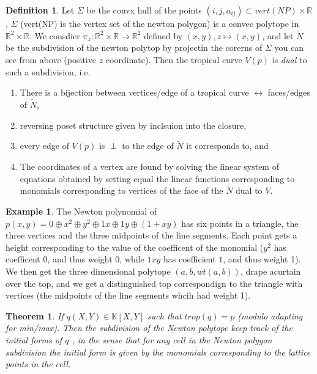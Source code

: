 \documentclass[11pt]{article}
\newtheorem{prototheorem}{Theorem}[section]
\newenvironment{theorem}
   {\begin{prototheorem}}
   {\end{prototheorem}}
\theoremstyle{definition}
\newtheorem{protoexample}{Example}[section]
\newenvironment{ex}
   {\begin{protoexample}}
   {\end{protoexample}}
\newtheorem{protodefinition}{Definition}[section]
\newenvironment{define}
   {\begin{protodefinition}}
   {\end{protodefinition}}
\def\RR{{\mathbb R}}
\def\KK{{\mathbb K}}
\begin{document}
\begin{define}
Let $\Sigma$ be the convx hull of the points $(i,j,a_{ij})\subset vert(NP)\times \RR$, $\Sigma$ (vert(NP) is the vertex set of the newton polygon) is a convec polytope in $\RR^2 \times \RR$. We consdier $\pi_z: \RR^2 \times \RR \rightarrow \RR^2$ defined by $(x,y), z \mapsto (x,y)$, and let $\tilde{N}$ be the subdivision of the newton polytop by projectin the corerns of $\Sigma$ you can see from above (positive $z$ coordinate). Then the tropical curve $V(p)$ is \emph{dual} to such a subdivision, i.e.

\begin{enumerate}
    \item There is a bijection between vertices/edge of a tropical curve $\leftrightarrow$ faces/edges of $\tilde{N}$,
    \item reversing poset structure given by inclsuion into the closure,
    \item every edge of $V(p)$ is $\perp$ to the edge of $\tilde{N}$ it corresponds to, and
    \item The coordinates of a vertex are found by solving the linear system of equations obtained by setting equal the linear functions corresponding to monomials corresponding to vertices of the face of the $\tilde{N}$ dual to $V$.
\end{enumerate}

\end{define}


\begin{ex}
  The Newton polynomial of $p(x,y) = 0 \oplus x^2 \oplus y^2 \oplus 1x \oplus 1y \oplus (1+xy)$ has six points in a triangle, the three vertices and the three midpoints of the line segments. Each point gets a height corresponding to the value of the coefficent of the monomial ($y^2$ has coefficent 0, and thus weight 0, while $1xy$ has coefficient $1$, and thus weight 1). We then get the three dimensional polytope $(a,b, wt(a,b))$, drape  acurtain over the top, and we get a distinguished top correspondign to the triangle with vertices (the midpoints of the line segments whcih had weight 1).
\end{ex}

\begin{theorem}
    If $q(X,Y)\in \KK[X,Y]$ such that $trop(q) = p $ (modulo adapting for min/max). Then the subdivision of the Newton polytope keep track of the initial forms of $q$ , in the sense that for any cell in the Newton polygon subdivision the initial form is given by the monomials corresponding to the lattice points in the cell.
\end{theorem}
\end{document}
